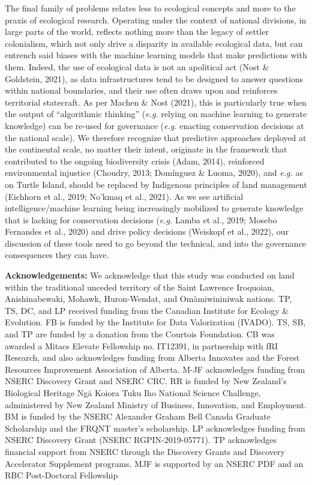 \documentclass[11pt]{article}
\begin{document}
The final family of problems relates less to ecological concepts and
more to the praxis of ecological research. Operating under the context
of national divisions, in large parts of the world, reflects nothing
more than the legacy of settler colonialism, which not only drive a
disparity in available ecological data, but can entrench said biases
with the machine learning models that make predictions with them.
Indeed, the use of ecological data is not an apolitical act (Nost \&
Goldstein, 2021), as data infrastructures tend to be designed to answer
questions within national boundaries, and their use often draws upon and
reinforces territorial statecraft. As per Machen \& Nost (2021), this is
particularly true when the output of ``algorithmic thinking''
(\emph{e.g.} relying on machine learning to generate knowledge) can be
re-used for governance (\emph{e.g.} enacting conservation decisions at
the national scale). We therefore recognize that predictive approaches
deployed at the continental scale, no matter their intent, originate in
the framework that contributed to the ongoing biodiversity crisis (Adam,
2014), reinforced environmental injustice (Choudry, 2013; Domínguez \&
Luoma, 2020), and \emph{e.g.} as on Turtle Island, should be replaced by
Indigenous principles of land management (Eichhorn et al., 2019; No'kmaq
et al., 2021). As we see artificial intelligence/machine learning being
increasingly mobilized to generate knowledge that is lacking for
conservation decisions (\emph{e.g.} Lamba et al., 2019; Mosebo Fernandes
et al., 2020) and drive policy decisions (Weiskopf et al., 2022), our
discussion of these tools need to go beyond the technical, and into the
governance consequences they can have.

\textbf{Acknowledgements:} We acknowledge that this study was conducted
on land within the traditional unceded territory of the Saint Lawrence
Iroquoian, Anishinabewaki, Mohawk, Huron-Wendat, and Omàmiwininiwak
nations. TP, TS, DC, and LP received funding from the Canadian Institute
for Ecology \& Evolution. FB is funded by the Institute for Data
Valorization (IVADO). TS, SB, and TP are funded by a donation from the
Courtois Foundation. CB was awarded a Mitacs Elevate Fellowship no.
IT12391, in partnership with fRI Research, and also acknowledges funding
from Alberta Innovates and the Forest Resources Improvement Association
of Alberta. M-JF acknowledges funding from NSERC Discovery Grant and
NSERC CRC. RR is funded by New Zealand's Biological Heritage Ngā Koiora
Tuku Iho National Science Challenge, administered by New Zealand
Ministry of Business, Innovation, and Employment. BM is funded by the
NSERC Alexander Graham Bell Canada Graduate Scholarship and the FRQNT
master's scholarship. LP acknowledges funding from NSERC Discovery Grant
(NSERC RGPIN-2019-05771). TP acknowledges financial support from NSERC
through the Discovery Grants and Discovery Accelerator Supplement
programs. MJF is supported by an NSERC PDF and an RBC Post-Doctoral
Fellowship
\end{document}
